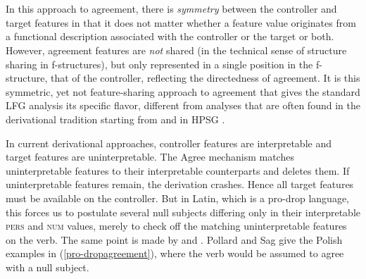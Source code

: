 \documentclass[output=paper,hidelinks]{langscibook}
\begin{document}
\ea\label{ex:f-descriptions}
 \\
 \\
\z
%
%
In this approach to agreement, there is \emph{symmetry} between the
controller and target features in that it does not matter whether a
feature value originates from a functional description associated with
the controller or the target or both. However, agreement features are
\emph{not} shared (in the technical sense of structure sharing in
f-structures), but only represented in a single position in the
f-structure, that of the controller, reflecting the directedness of
agreement. It is this symmetric, yet not feature-sharing approach to agreement that gives the standard LFG analysis its specific flavor, different from analyses that are often found in the
derivational tradition starting from \citet{Pollock:89} and in HPSG \citep[chapter~2]{pollard1994head-driven}.

In current derivational approaches, controller features are
inter\-pret\-able and target features are un\-inter\-pret\-able. The Agree
mechanism matches un\-inter\-pret\-able features to their interpretable
counterparts and deletes them. If uninterpretable features remain, the
derivation crashes. Hence all target features must be available on the
controller. But in Latin, which is a pro-drop language, this forces us
to postulate several null subjects differing only in their
interpretable \textsc{pers} and \textsc{num} values, merely to check
off the matching uninterpretable features on the verb. The same point
is made by \citet{Barlow:PhD} and \citet[64]{pollard1994head-driven}. Pollard and
Sag give the Polish examples in (\ref{pro-dropagreement}), where the verb would be assumed to agree with a
null subject.
\end{document}
